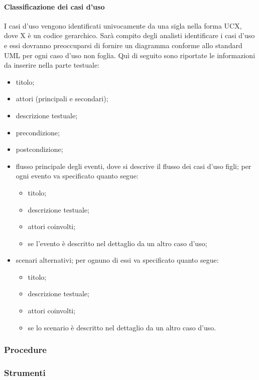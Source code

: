 			\paragraph{Classificazione dei casi d'uso}
				I casi d'uso vengono identificati univocamente da una sigla nella forma UCX, dove X è un codice gerarchico. Sarà compito degli analisti identificare i casi d'uso e essi dovranno preoccuparsi di fornire un diagramma conforme allo standard UML per ogni caso d'uso non foglia. Quì di seguito sono riportate le informazioni da inserire nella parte testuale:
				\begin{itemize}
					\item titolo;
					\item attori (principali e secondari);
					\item descrizione testuale;
					\item precondizione;
					\item postcondizione;
					\item flusso principale degli eventi, dove si descrive il flusso dei casi d'uso figli; per ogni evento va specificato quanto segue:
					\begin{itemize}
						\item titolo;
						\item descrizione testuale;
						\item attori coinvolti;
						\item se l’evento è descritto nel dettaglio da un altro caso d’uso;
					\end{itemize}
					\item scenari alternativi; per ognuno di essi va specificato quanto segue:
					\begin{itemize}
						\item titolo;
						\item descrizione testuale;
						\item attori coinvolti;
						\item se lo scenario è descritto nel dettaglio da un altro caso d’uso.
					\end{itemize}
				\end{itemize}
		\subsubsection{Procedure}
		\subsubsection{Strumenti}
